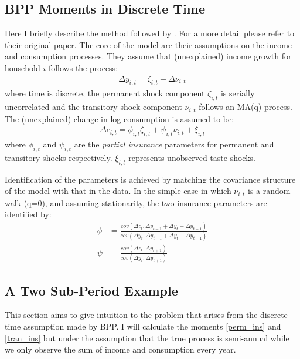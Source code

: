 \documentclass[titlepage]{\econtex}\newcommand{\texname}{BPP_PSID_TimeAgg}
\begin{document}
\subsection{BPP Moments in Discrete Time}
Here I briefly describe the method followed by \cite{blundell_consumption_2008}. For a more detail please refer to their original paper. The core of the model are their assumptions on the income and consumption processes. They assume that (unexplained) income growth for household $i$ follows the process:
\begin{align*}
\Delta y_{i,t} = \zeta_{i,t} + \Delta \nu_{i,t}
\end{align*}
where time is discrete, the permanent shock component $\zeta_{i,t}$ is serially uncorrelated and the transitory shock component $\nu_{i,t}$ follows an MA(q) process. The (unexplained) change in log consumption is assumed to be:
\begin{align*}
\Delta c_{i,t} = \phi_{i,t}\zeta_{i,t} + \psi_{i,t} \nu_{i,t} + \xi_{i,t}
\end{align*}
where $\phi_{i,t}$ and $\psi_{i,t}$ are the \textit{partial insurance} parameters for permanent and transitory shocks respectively. $\xi_{i,t}$ represents unobserved taste shocks. 

Identification of the parameters is achieved by matching the covariance structure of the model with that in the data. In the simple case in which $\nu_{i,t}$ is a random walk (q=0), and assuming stationarity, the two insurance parameters are identified by:
\begin{align}
\phi &= \frac{cov(\Delta c_t, \Delta y_{t-1}+\Delta y_{t}+\Delta y_{t+1})}{cov(\Delta y_t, \Delta y_{t-1}+\Delta y_{t}+\Delta y_{t+1})} \label{perm_ins} \\
\psi &= \frac{cov(\Delta c_t,\Delta y_{t+1})}{cov(\Delta y_t,\Delta y_{t+1})} \label{tran_ins}
\end{align}

\subsection{A Two Sub-Period Example}
This section aims to give intuition to the problem that arises from the discrete time assumption made by BPP. I will calculate the moments \ref{perm_ins} and \ref{tran_ins} but under the assumption that the true process is semi-annual while we only observe the sum of income and consumption every year.
\end{document}

